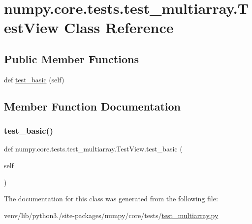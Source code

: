 \hypertarget{classnumpy_1_1core_1_1tests_1_1test__multiarray_1_1TestView}{}\section{numpy.\+core.\+tests.\+test\+\_\+multiarray.\+Test\+View Class Reference}
\label{classnumpy_1_1core_1_1tests_1_1test__multiarray_1_1TestView}
\subsection*{Public Member Functions}
\begin{DoxyCompactItemize}
\item 
def \hyperlink{classnumpy_1_1core_1_1tests_1_1test__multiarray_1_1TestView_a7a78c37aefe2a4dc34924e3bdd60f1d6}{test\+\_\+basic} (self)
\end{DoxyCompactItemize}


\subsection{Member Function Documentation}
\mbox{\label{classnumpy_1_1core_1_1tests_1_1test__multiarray_1_1TestView_a7a78c37aefe2a4dc34924e3bdd60f1d6}} 
\subsubsection{\texorpdfstring{test\+\_\+basic()}{test\_basic()}}
{\footnotesize\ttfamily def numpy.\+core.\+tests.\+test\+\_\+multiarray.\+Test\+View.\+test\+\_\+basic (\begin{DoxyParamCaption}\item[{}]{self }\end{DoxyParamCaption})}



The documentation for this class was generated from the following file\+:\begin{DoxyCompactItemize}
\item 
venv/lib/python3./site-\/packages/numpy/core/tests/\hyperlink{core_2tests_2test__multiarray_8py}{test\+\_\+multiarray.\+py}\end{DoxyCompactItemize}
